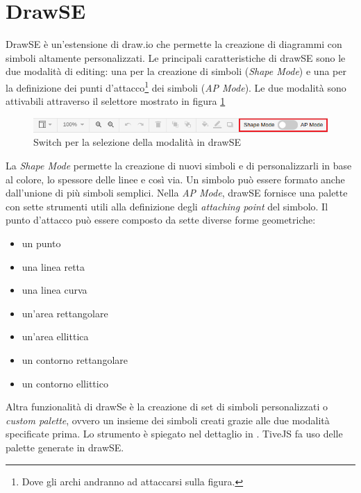     \section{DrawSE}
        DrawSE è un'estensione di draw.io che permette la creazione di diagrammi con simboli altamente personalizzati. Le principali caratteristiche di drawSE sono le due modalità di editing: una per la creazione di simboli (\textit{Shape Mode}) e una per la definizione dei punti d'attacco\footnote{Dove gli archi andranno ad attaccarsi sulla figura.} dei simboli (\textit{AP Mode}).
        Le due modalità sono attivabili attraverso il selettore mostrato in figura \ref{fig:mode_switch}
        \begin{figure}[htbp]
            \centering
            \includegraphics[scale=0.7]{Figure/mode_switch.png}
            \caption{Switch per la selezione della modalità in drawSE}
            \label{fig:mode_switch}
        \end{figure}
        \newline
        La \textit{Shape Mode} permette la creazione di nuovi simboli e di personalizzarli in base al colore, lo spessore delle linee e così via. Un simbolo può essere formato anche dall'unione di più simboli semplici.
        Nella \textit{AP Mode}, drawSE fornisce una palette con sette strumenti utili alla definizione degli \textit{attaching point} del simbolo. Il punto d'attacco può essere composto da sette diverse forme geometriche:
        \begin{itemize}
            \item un punto
            \item una linea retta
            \item una linea curva
            \item un'area rettangolare
            \item un'area ellittica
            \item un contorno rettangolare
            \item un contorno ellittico
        \end{itemize}
        Altra funzionalità di drawSe è la creazione di set di simboli personalizzati o \textit{custom palette}, ovvero un insieme dei simboli creati grazie alle due modalità specificate prima. Lo strumento è spiegato nel dettaglio in \cite{drawSE}. TiveJS fa uso delle palette generate in drawSE.